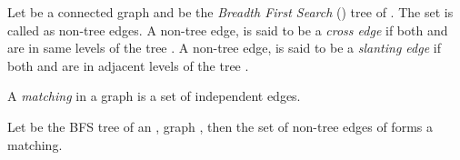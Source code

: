 \documentclass[runningheads]{llncs}
\begin{document}
\begin{definition}
Let  be a connected graph and  be the \emph{Breadth First Search} () tree of . The set  is called as non-tree edges. A non-tree edge,  is said to be a \emph{cross edge} if both  and  are in same levels of the tree . A non-tree edge,  is said to be a \emph{slanting edge} if both  and  are in adjacent levels of the tree .
\end{definition}

\begin{definition}
A \emph{matching} in a graph  is a set of independent edges.
\end{definition}

\begin{lemma}
\label{matching}
 Let  be the BFS tree of an , graph , then the set of non-tree edges of  forms a matching.
\end{lemma}
\end{document}
